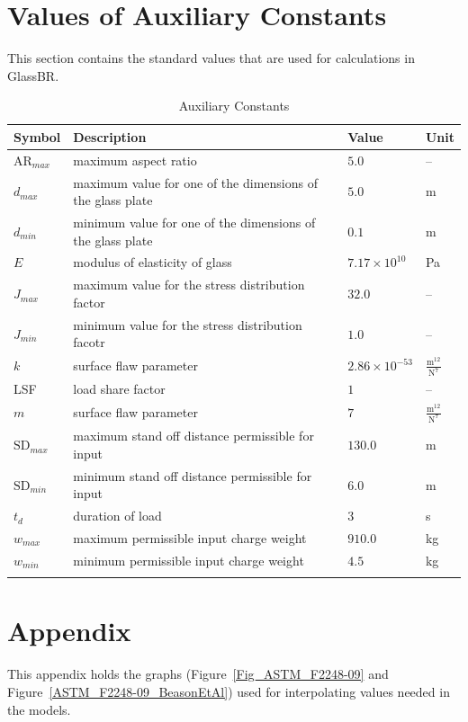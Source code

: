 \documentclass[12pt]{article}
\newcommand{\progname}{GlassBR}
\begin{document}
\section{Values of Auxiliary Constants}
\label{Sec:ValuofAuxiCons}
This section contains the standard values that are used for calculations in
\progname{}.

\begin{longtabu}{l X[l] l l}
\toprule
Symbol & Description & Value & Unit
\\
\midrule
${\text{AR}_{max}}$ & maximum aspect ratio & $5.0$ & --
\\
${d_{max}}$ & maximum value for one of the dimensions of the glass plate & $5.0$ & m
\\
${d_{min}}$ & minimum value for one of the dimensions of the glass plate & $0.1$ & m
\\
$E$ & modulus of elasticity of glass & $7.17\times 10^{10}$ & Pa
\\
${J_{max}}$ & maximum value for the stress distribution factor & $32.0$ & --
\\
${J_{min}}$ & minimum value for the stress distribution facotr & $1.0$ & --
\\
$k$ & surface flaw parameter & $2.86\times 10^{-53}$ & $\frac{\text{m}^{12}}{\text{N}^{7}}$
\\
LSF & load share factor & $1$ & --
\\
$m$ & surface flaw parameter & $7$ & $\frac{\text{m}^{12}}{\text{N}^{7}}$
\\
${\text{SD}_{max}}$ & maximum stand off distance permissible for input & $130.0$ & m
\\
${\text{SD}_{min}}$ & minimum stand off distance permissible for input & $6.0$ & m
\\
${t_{d}}$ & duration of load & $3$ & s
\\
${w_{max}}$ & maximum permissible input charge weight & $910.0$ & kg
\\
${w_{min}}$ & minimum permissible input charge weight & $4.5$ & kg
\\
\bottomrule
\caption{Auxiliary Constants}
\label{Table:AuxiCons}
\end{longtabu}




\section{Appendix}

This appendix holds the graphs (Figure~\ref{Fig_ASTM_F2248-09} and
Figure~\ref{ASTM_F2248-09_BeasonEtAl}) used for interpolating values needed in
the models.
\end{document}
